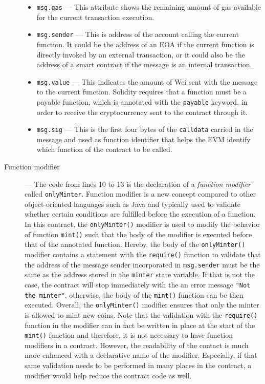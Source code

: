 \begin{description}
\begin{itemize}
			\item \texttt{msg.gas} --- This attribute shows the remaining amount of gas available for the current transaction execution.

			\item \texttt{msg.sender} --- This is address of the account calling the current function. It could be the address of an EOA if the current function is directly invoked by an external transaction, or it could also be the address of a smart contract if the message is an internal transaction.

			\item \texttt{msg.value} --- This indicates the amount of Wei sent with the message to the current function. Solidity requires that a function must be a payable function, which is annotated with the \texttt{payable} keyword, in order to receive the cryptocurrency sent to the contract through it.

			\item \texttt{msg.sig} --- This is the first four bytes of the \texttt{calldata} carried in the message and used as function identifier that helps the EVM identify which function of the contract to be called. 
		\end{itemize}

\item[Function modifier] ---  The code from lines 10 to 13 is the declaration of a \textit{function modifier} called \texttt{onlyMinter}. Function modifier is a new concept compared to other object-oriented languages such as Java and typically used to validate whether certain conditions are fulfilled before the execution of a function. In this contract, the \texttt{onlyMinter()} modifier is used to modify the behavior of function \texttt{mint()} such that the body of the modifier is executed before that of the annotated function. Hereby, the body of the \texttt{onlyMinter()} modifier contains a statement with the \texttt{require()} function to validate that the address of the message sender incorporated in \texttt{msg.sender} must be the same as the address stored in the \texttt{minter} state variable. If that is not the case, the contract will stop immediately with the an error message \texttt{"Not the minter"}, otherwise, the body of the \texttt{mint()} function can be then executed. Overall, the \texttt{onlyMinter()} modifier ensures that only the minter is allowed to mint new coins. Note that the validation with the \texttt{require()} function in the modifier can in fact be written in place at the start of the \texttt{mint()} function and therefore, it is not necessary to have function modifiers in a contract. However, the readability of the contact is much more enhanced with a declarative name of the modifier. Especially, if that same validation needs to be performed in many places in the contract, a modifier would help reduce the contract code as well. 


\end{description}
